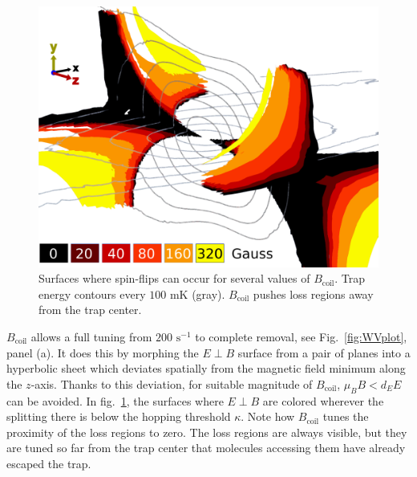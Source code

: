 \documentclass[%
 reprint,
groupedaddress,
 amsmath,amssymb,
 aps,
prl,
]{revtex4-1}
\newcommand{\epb}{$E\!\perp\!B$}
\begin{document}
\begin{figure}[tb]
\includegraphics[width=\linewidth]{LossSurfaces/Loss_Surface_Chunks_recolored_heat_legend.png}%
\caption{
Surfaces where spin-flips can occur for several values of $B_\text{coil}$. Trap energy contours every $100\text{ mK}$ (gray). $B_\text{coil}$ pushes loss regions away from the trap center.
\label{fig:LSurfs}}
\end{figure}

$B_\text{coil}$ allows a full tuning from $200\text{ s}^{-1}$ to complete removal, see Fig.~\ref{fig:WVplot}, panel (a). It does this by morphing the \epb{} surface from a pair of planes into a hyperbolic sheet which deviates spatially from the magnetic field minimum along the $z$-axis. Thanks to this deviation, for suitable magnitude of $B_\text{coil}$, $\mu_BB< d_EE$ can be avoided. In fig.~\ref{fig:LSurfs}, the surfaces where \epb{} are colored wherever the splitting there is below the hopping threshold $\kappa$. Note how $B_\text{coil}$ tunes the proximity of the loss regions to zero. The loss regions are always visible, but they are tuned so far from the trap center that molecules accessing them have already escaped the trap.
\end{document}
